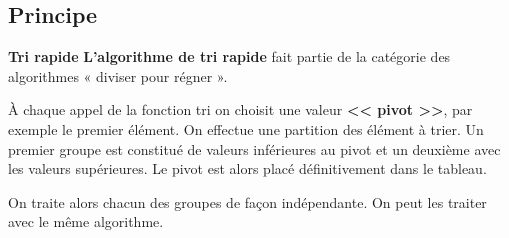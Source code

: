 \subsection{Principe}

\begin{defi}\small{\textbf{\textsf{Tri rapide}}}
\textbf{L'algorithme de tri rapide} fait partie de la catégorie des algorithmes « diviser pour régner ».

À chaque appel de la fonction tri on choisit une valeur \textbf{<< pivot >>}, par exemple le premier élément. On effectue une partition des élément à trier. Un premier groupe est constitué de valeurs inférieures au pivot  et un deuxième avec les valeurs supérieures.
Le pivot est alors placé définitivement dans le tableau.

On traite alors chacun des groupes de façon indépendante. On peut les traiter avec le même algorithme.
\end{defi}






